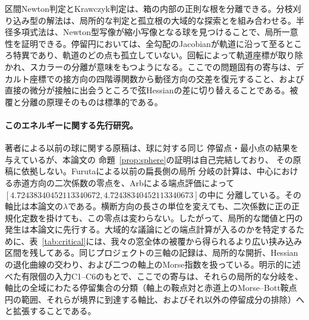 区間Newton判定とKrawczyk判定は、箱の内部の正則な根を分離できる\citep{intervalNewton}。分枝刈り込み型の解法は、局所的な判定と孤立根の大域的な探索とを組み合わせる\citep{branchPrune}。半径多項式法は、Newton型写像が縮小写像となる球を見つけることで、局所一意性を証明できる\citep{radiiContinuation}。停留円においては、全勾配のJacobianが軌道に沿って至るところ特異であり、軌道のどの点も孤立していない。回転によって軌道座標が取り除かれ、スカラーの分離が意味をもつようになる。ここでの問題固有の寄与は、デカルト座標での接方向の四階導関数から動径方向の交差を復元すること、および直接の微分が接触に出会うところで弦Hessianの差に切り替えることである。被覆と分離の原理そのものは標準的である。

\paragraph{このエネルギーに関する先行研究。}
著者による以前の球に関する原稿は、球に対する同じ
停留点・最小点の結果を与えているが\citep{furutaSphere}、本論文の
命題~\ref{prop:sphere}の証明は自己完結しており、
その原稿に依拠しない。Furutaによる以前の扁長側の局所
分岐の計算\citep{furutaProlate}は、中心における赤道方向の二次係数の零点を、Arbによる端点評価によって
$[4.72438340452113340672,4.72438340452113340673]$の中に
分離している。その軸比は本論文の$\lambda$である。横断方向の長さの単位を変えても、二次係数に正の正規化定数を掛けても、この零点は変わらない。したがって、局所的な閾値と円の発生は本論文に先行する。大域的な議論にどの端点計算が入るのかを特定するために、表~\ref{tab:critical}には、我々の窓全体の被覆から得られるより広い挟み込み区間を残してある。同じプロジェクトの三軸の記録は、局所的な開折、Hessianの退化曲線の交わり、および二つの軸上のMorse指数を扱っている。明示的に述べた有限個の入力C1--C6のもとで、ここでの寄与は、それらの局所的な分岐を、軸比の全域にわたる停留集合の分類（軸上の鞍点対と赤道上のMorse--Bott鞍点円の範囲、それらが境界に到達する軸比、およびそれ以外の停留成分の排除）へと拡張することである\citep{furutaProlate,furutaTriax}。
